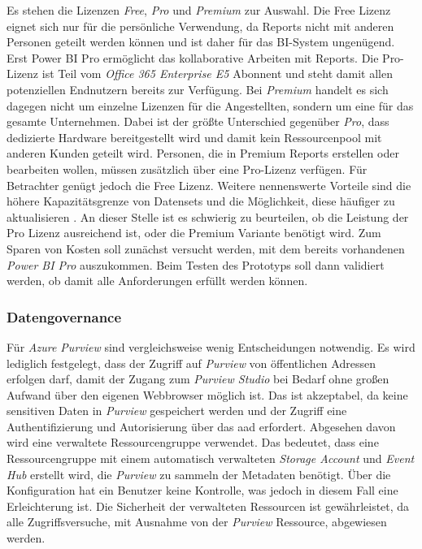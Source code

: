 Es stehen die Lizenzen \textit{Free}, \textit{Pro} und \textit{Premium} zur Auswahl. Die Free Lizenz eignet sich nur für die persönliche Verwendung, da Reports nicht mit anderen Personen geteilt werden können und ist daher für das BI-System ungenügend. Erst Power BI Pro ermöglicht das kollaborative Arbeiten mit Reports. Die Pro-Lizenz ist Teil vom \textit{Office 365 Enterprise E5} Abonnent und steht damit allen potenziellen Endnutzern bereits zur Verfügung. Bei \textit{Premium} handelt es sich dagegen nicht um einzelne Lizenzen für die Angestellten, sondern um eine für das gesamte Unternehmen. Dabei ist der größte Unterschied gegenüber \textit{Pro}, dass dedizierte Hardware bereitgestellt wird und damit kein Ressourcenpool mit anderen Kunden geteilt wird. Personen, die in Premium Reports erstellen oder bearbeiten wollen, müssen zusätzlich über eine Pro-Lizenz verfügen. Für Betrachter genügt jedoch die Free Lizenz. Weitere nennenswerte Vorteile sind die höhere Kapazitätsgrenze von Datensets und die Möglichkeit, diese häufiger zu aktualisieren \cite[vgl.][]{gunnarsson_pro_2020}. An dieser Stelle ist es schwierig zu beurteilen, ob die Leistung der Pro Lizenz ausreichend ist, oder die Premium Variante benötigt wird. Zum Sparen von Kosten soll zunächst versucht werden, mit dem bereits vorhandenen \textit{Power BI Pro} auszukommen. Beim Testen des Prototyps soll dann validiert werden, ob damit alle Anforderungen erfüllt werden können.

\subsubsection{Datengovernance} \label{subsec:infra:konfig:purview}
Für \textit{Azure Purview} sind vergleichsweise wenig Entscheidungen notwendig. Es wird lediglich festgelegt, dass der Zugriff auf \textit{Purview} von öffentlichen Adressen erfolgen darf, damit der Zugang zum \textit{Purview Studio} bei Bedarf ohne großen Aufwand über den eigenen Webbrowser möglich ist. Das ist akzeptabel, da keine sensitiven Daten in \textit{Purview} gespeichert werden und der Zugriff eine Authentifizierung und Autorisierung über das \ac{aad} erfordert. Abgesehen davon wird eine verwaltete Ressourcengruppe verwendet. Das bedeutet, dass eine Ressourcengruppe mit einem automatisch verwalteten \textit{Storage Account} und \textit{Event Hub} erstellt wird, die \textit{Purview} zu sammeln der Metadaten benötigt. Über die Konfiguration hat ein Benutzer keine Kontrolle, was jedoch in diesem Fall eine Erleichterung ist. Die Sicherheit der verwalteten Ressourcen ist gewährleistet, da alle Zugriffsversuche, mit Ausnahme von der \textit{Purview} Ressource, abgewiesen werden. \cite[vgl.][]{msdoc_22_purviewDeploymentBestPract, msdoc_21_managedApps}

